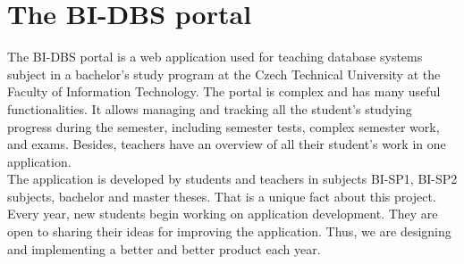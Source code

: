 \section{The BI-DBS portal}
The BI-DBS portal is a web application used for teaching database systems subject in a bachelor's study program at the Czech Technical University at the Faculty of Information Technology. The portal is complex and has many useful functionalities. It allows managing and tracking all the student's studying progress during the semester, including semester tests, complex semester work, and exams. Besides, teachers have an overview of all their student's work in one application.\\
The application is developed by students and teachers in subjects BI-SP1, BI-SP2 subjects, bachelor and master theses. That is a unique fact about this project. Every year, new students begin working on application development. They are open to sharing their ideas for improving the application. Thus, we are designing and implementing a better and better product each year.

